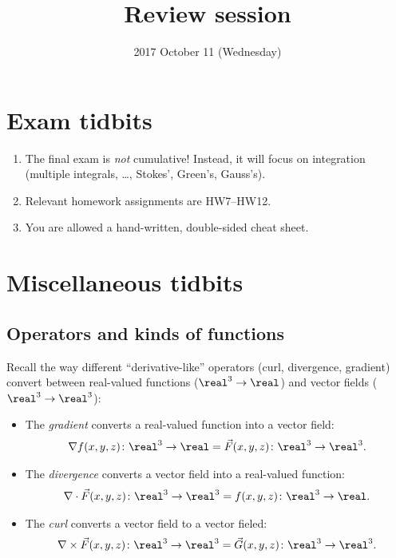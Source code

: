 \documentclass{multi}
\title{Review session}
\date{2017 October 11 (Wednesday)}
\begin{document}
\section*{Exam tidbits}

\begin{enumerate}
\item
  The final exam is \emph{not} cumulative!  Instead, it will focus on
  integration (multiple integrals, \dots, Stokes', Green's, Gauss's).
\item
  Relevant homework assignments are HW7--HW12.

\item
  You are allowed a hand-written, double-sided cheat sheet.
\end{enumerate}

\section*{Miscellaneous tidbits}

\subsection*{Operators and kinds of functions}

Recall the way different ``derivative-like'' operators (curl, divergence,
gradient) convert between real-valued functions (\(\real^3 \to \real\)) and
vector fields (\(\real^3 \to \real^3\)):
\begin{itemize}
\item
  The \emph{gradient} converts a real-valued function into a vector field:
  \begin{gather*}
    \nabla f(x, y, z)\colon \real^3 \to \real = \vec F(x, y, z) \colon \real^3 \to \real^3.
  \end{gather*}

\item
  The \emph{divergence} converts a vector field into a real-valued function:
  \begin{gather*}
    \nabla \cdot \vec F(x, y, z) \colon \real^3 \to \real^3 = f(x, y, z)\colon
    \real^3 \to \real.
  \end{gather*}

\item
  The \emph{curl} converts a vector field to a vector fieled:
  \begin{gather*}
    \nabla \times \vec F(x, y, z) \colon \real^3 \to \real^3 = \vec G(x, y, z)
    \colon \real^3 \to \real^3.
  \end{gather*}
  
\end{itemize}
\end{document}
